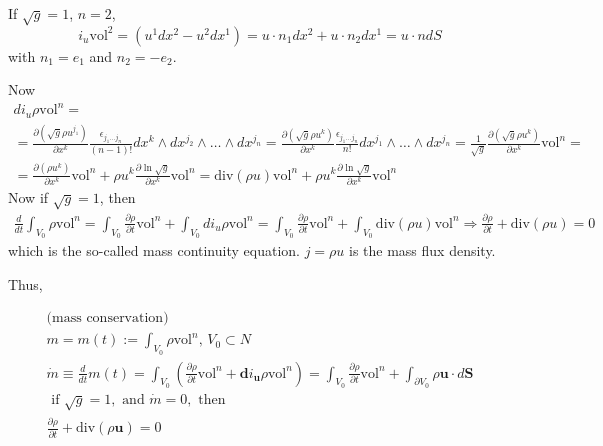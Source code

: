 If $\sqrt{g} = 1$, $n=2$, 
\[
i_u \text{vol}^2 = (u^1 dx^2 - u^2 dx^1) = u\cdot n_1 dx^2 + u\cdot n_2 dx^1 = u\cdot n dS
\]
with $n_1 =e_1$ and $n_2=-e_2$.  

Now 
\[
\begin{gathered}
di_u \rho \text{vol}^n = \\
= \frac{ \partial ( \sqrt{g} \rho u^{j_1} ) }{ \partial x^k} \frac{ \epsilon_{j_1 \dots j_n} }{ (n-1)! } dx^k \wedge dx^{j_2} \wedge \dots \wedge dx^{j_n} = \frac{ \partial (\sqrt{ g} \rho u^k) }{ \partial x^k} \frac{ \epsilon_{j_1 \dots j_n }}{ n!} dx^{j_1} \wedge \dots \wedge dx^{j_n} = \frac{1}{\sqrt{g}} \frac{ \partial (\sqrt{g} \rho u^k)}{ \partial x^k} \text{vol}^n = \\
= \frac{ \partial (\rho u^k)}{ \partial x^k} \text{vol}^n + \rho u^k \frac{ \partial \ln{ \sqrt{g}}}{ \partial x^k} \text{vol}^n = \text{div}(\rho u) \text{vol}^n + \rho u^k \frac{ \partial \ln{ \sqrt{g}}}{ \partial x^k} \text{vol}^n
\end{gathered}
\]
Now if $\sqrt{g}=1$, then 
\[
\begin{gathered}
\frac{d}{dt} \int_{V_0} \rho \text{vol}^n = \int_{V_0} \frac{ \partial \rho }{ \partial t} \text{vol}^n + \int_{V_0} di_u \rho \text{vol}^n = \int_{V_0} \frac{ \partial \rho }{ \partial t} \text{vol}^n + \int_{V_0} \text{div}(\rho u) \text{vol}^n \Longrightarrow \frac{ \partial \rho}{\partial t} + \text{div}(\rho u) = 0
\end{gathered}
\]
which is the so-called mass continuity equation.  $ j = \rho u$ is the mass flux density.  

Thus,

\begin{equation}\label{dgdt:Eq:MassConservationForContinuum}
\begin{gathered}
\text{(mass conservation)} \\
m = m(t) := \int_{V_0} \rho \text{vol}^n, \, V_0 \subset N \\
\dot{m} \equiv \frac{d}{dt}m(t) = \int_{V_0} \left( \frac{\partial \rho }{ \partial t} \text{vol}^n + \mathbf{d}i_{\mathbf{u}} \rho \text{vol}^n \right) = \boxed{ \int_{V_0} \frac{ \partial \rho }{ \partial t} \text{vol}^n + \int_{\partial V_0} \rho \mathbf{u} \cdot d\mathbf{S} } \\
\text{ if } \sqrt{g} = 1, \text{ and } \dot{m} = 0, \text{ then } \\
\frac{\partial \rho }{ \partial t} + \text{div}(\rho \mathbf{u}) = 0 
\end{gathered}
\end{equation}

